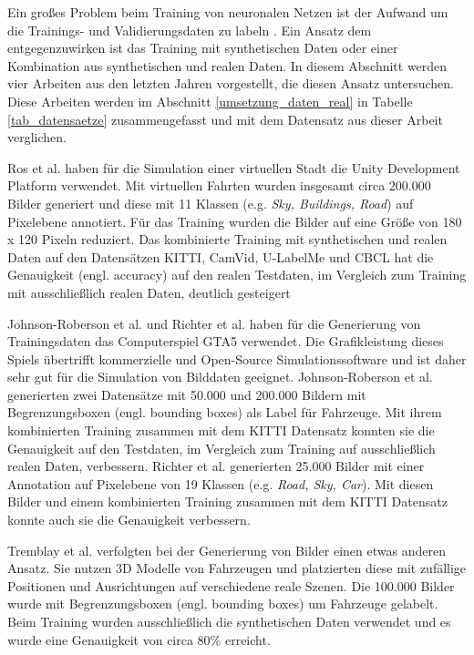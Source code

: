 Ein großes Problem beim Training von neuronalen Netzen ist der Aufwand um die Trainings- und Validierungsdaten zu labeln \cite{richter2016playing}. Ein Ansatz dem entgegenzuwirken ist das Training mit synthetischen Daten oder einer Kombination aus synthetischen und realen Daten. In diesem Abschnitt werden vier Arbeiten aus den letzten Jahren vorgestellt, die diesen Ansatz untersuchen. Diese Arbeiten werden im Abschnitt \ref{umsetzung_daten_real} in Tabelle \ref{tab_datensaetze} zusammengefasst und mit dem Datensatz aus dieser Arbeit verglichen.

Ros et al. \cite{ros2016synthia} haben für die Simulation einer virtuellen Stadt die Unity Development Platform verwendet. Mit virtuellen Fahrten wurden insgesamt circa 200.000 Bilder generiert und diese mit 11 Klassen (e.g. \textit{Sky, Buildings, Road}) auf Pixelebene annotiert. Für das Training wurden die Bilder auf eine Größe von 180 x 120 Pixeln reduziert. Das kombinierte Training mit synthetischen und realen Daten auf den Datensätzen KITTI, CamVid, U-LabelMe und CBCL hat die Genauigkeit (engl. accuracy) auf den realen Testdaten, im Vergleich zum Training mit ausschließlich realen Daten, deutlich gesteigert

Johnson-Roberson et al. \cite{johnson2017driving} und Richter et al. \cite{richter2016playing} haben für die Generierung von Trainingsdaten das Computerspiel GTA5 verwendet. Die Grafikleistung dieses Spiels übertrifft kommerzielle und Open-Source Simulationssoftware und ist daher sehr gut für die Simulation von Bilddaten geeignet. Johnson-Roberson et al. \cite{johnson2017driving} generierten zwei Datensätze mit 50.000 und 200.000 Bildern mit Begrenzungsboxen (engl. bounding boxes) als Label für Fahrzeuge. Mit ihrem kombinierten Training zusammen mit dem KITTI Datensatz konnten sie die Genauigkeit auf den Testdaten, im Vergleich zum Training auf ausschließlich realen Daten, verbessern. Richter et al. \cite{richter2016playing} generierten 25.000 Bilder mit einer Annotation auf Pixelebene von 19 Klassen (e.g. \textit{Road, Sky, Car}). Mit diesen Bilder und einem kombinierten Training zusammen mit dem KITTI Datensatz konnte auch sie die Genauigkeit verbessern.

Tremblay et al. \cite{tremblay2018training} verfolgten bei der Generierung von Bilder einen etwas anderen Ansatz. Sie nutzen 3D Modelle von Fahrzeugen und platzierten diese mit zufällige Positionen und Ausrichtungen auf verschiedene reale Szenen. Die 100.000 Bilder wurde mit Begrenzungsboxen (engl. bounding boxes) um Fahrzeuge gelabelt. Beim Training wurden ausschließlich die synthetischen Daten verwendet und es wurde eine Genauigkeit von circa 80\% erreicht.

